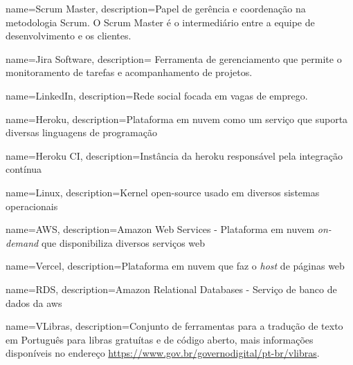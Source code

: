  {
	name=Scrum Master,
	description={Papel de gerência e coordenação na metodologia Scrum. O Scrum Master é o intermediário entre a equipe de desenvolvimento e os clientes.}
}

 {
	name=Jira Software,
	description={ Ferramenta de gerenciamento que permite o monitoramento de tarefas e acompanhamento de projetos.}
}   

 {
	name=LinkedIn,
	description={Rede social focada em vagas de emprego.}
}   

 {
	name=Heroku,
	description={Plataforma em nuvem como um serviço que suporta diversas linguagens de programação}
} 

 {
	name=Heroku CI,
	description={Instância da heroku responsável pela integração contínua}
} 

 {
	name=Linux,
	description={Kernel open-source usado em diversos sistemas operacionais}
}   

 {
	name=AWS,
	description={Amazon Web Services - Plataforma em nuvem \emph{on-demand} que disponibiliza diversos serviços web}
}    

 {
	name=Vercel,
	description={Plataforma em nuvem que faz o \emph{host} de páginas web}
}  

 {
	name=RDS,
	description={Amazon Relational Databases - Serviço de banco de dados da \gls{aws}}
}

 {
	name=VLibras,
	description={Conjunto de ferramentas para a tradução de texto em Português para \ac{libras} gratuítas e de código aberto, mais informações disponíveis no endereço \url{https://www.gov.br/governodigital/pt-br/vlibras}.}
}


 



